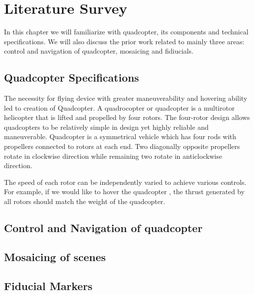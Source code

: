 \chapter{Literature Survey}
\label{ch:quadcopter}
In this chapter we will familiarize with quadcopter, its components and
technical specifications. We will also discuss the prior work related to
mainly three areas: control and navigation of quadcopter, mosaicing and
fidiucials. 
\section{Quadcopter Specifications}
The necessity for flying device with greater maneuverability and hovering
ability led to creation of Quadcopter. A quadrocopter or quadcopter  is a
multirotor helicopter that is lifted and propelled by four rotors. The
four-rotor design allows quadcopters to be relatively simple in design yet
highly reliable and maneuverable. Quadcopter  is a  symmetrical vehicle which
has four rods with propellers connected to rotors  at each end. Two diagonally
opposite propellers rotate in clockwise direction while remaining  two rotate
in anticlockwise direction. 

The speed of each rotor can be independently varied
to achieve various controls. For example, if we would like to hover the
quadcopter , the thrust generated by all rotors should match the weight of the
quadcopter.

\section{Control and Navigation of quadcopter}

\section{Mosaicing of scenes}

\section{Fiducial Markers}
